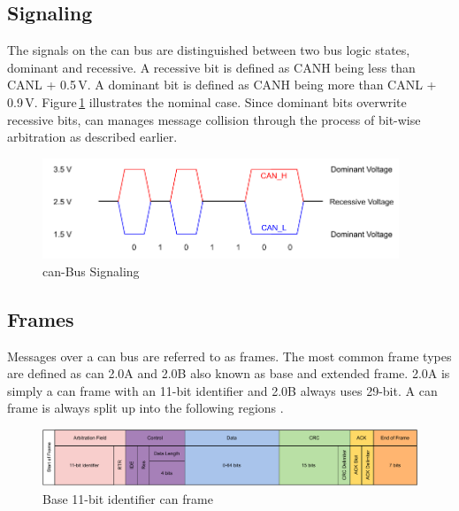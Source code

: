 \subsection{Signaling}
The signals on the \acrshort{can} bus are distinguished between two bus logic states, dominant and recessive. A recessive bit is defined as CANH being less than CANL + 0.5\,V. A dominant bit is defined as CANH being more than CANL + 0.9\,V. Figure\,\ref{fig:can-signaling} illustrates the nominal case. Since dominant bits overwrite recessive bits, \acrshort{can} manages message collision through the process of bit-wise arbitration as described earlier.

\begin{figure}[h!]
	\centering
	\includegraphics[height=3cm]{images/can-signaling}
	\caption{\acrshort{can}-Bus Signaling}
	\label{fig:can-signaling}
\end{figure}

\subsection{Frames}
Messages over a \acrshort{can} bus are referred to as frames. The most common frame types are defined as \acrshort{can} 2.0A and 2.0B also known as base and extended frame. 2.0A is simply a \acrshort{can} frame with an 11-bit identifier and 2.0B always uses 29-bit. A \acrshort{can} frame is always split up into the following regions \cite{can_bus_tutorial}.

\begin{figure}[h!]
	\centering
	\includegraphics[width=\textwidth]{images/can-frame}
	\caption{Base 11-bit identifier \acrshort{can} frame}
	\label{fig:can-frame}
\end{figure}

